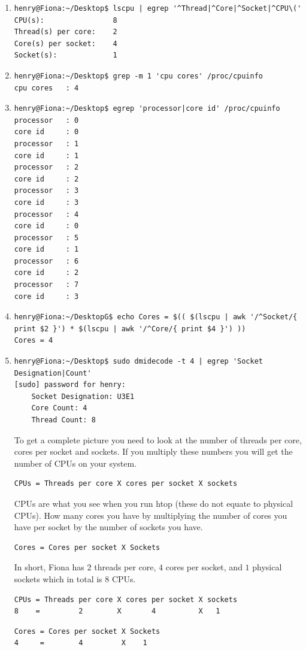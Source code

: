 \documentclass{article}
\begin{document}
\begin{enumerate}
\begin{verbatim}
\end{verbatim}
\normalsize
\item 
\tiny
\begin{verbatim}
henry@Fiona:~/Desktop$ lscpu | egrep '^Thread|^Core|^Socket|^CPU\('
CPU(s):                8
Thread(s) per core:    2
Core(s) per socket:    4
Socket(s):             1
\end{verbatim}
\normalsize
\item 
\tiny
\begin{verbatim}
henry@Fiona:~/Desktop$ grep -m 1 'cpu cores' /proc/cpuinfo
cpu cores	: 4
\end{verbatim}
\normalsize
\item 
\tiny
\begin{verbatim}
henry@Fiona:~/Desktop$ egrep 'processor|core id' /proc/cpuinfo
processor	: 0
core id		: 0
processor	: 1
core id		: 1
processor	: 2
core id		: 2
processor	: 3
core id		: 3
processor	: 4
core id		: 0
processor	: 5
core id		: 1
processor	: 6
core id		: 2
processor	: 7
core id		: 3
\end{verbatim}
\normalsize
\item 
\tiny
\begin{verbatim}
henry@Fiona:~/DesktopG$ echo Cores = $(( $(lscpu | awk '/^Socket/{ print $2 }') * $(lscpu | awk '/^Core/{ print $4 }') ))
Cores = 4
\end{verbatim}
\normalsize
\item 
\tiny
\begin{verbatim}
henry@Fiona:~/Desktop$ sudo dmidecode -t 4 | egrep 'Socket Designation|Count'
[sudo] password for henry: 
	Socket Designation: U3E1
	Core Count: 4
	Thread Count: 8
\end{verbatim}
\normalsize
To get a complete picture you need to look at the number of threads per core, cores per socket and sockets. If you multiply these numbers you will get the number of CPUs on your system.
\begin{verbatim}
CPUs = Threads per core X cores per socket X sockets 
\end{verbatim}
CPUs are what you see when you run htop (these do not equate to physical CPUs). How many cores you have by multiplying the number of cores you have per socket by the number of sockets you have.
\begin{verbatim}
Cores = Cores per socket X Sockets
\end{verbatim}
In short, Fiona has $2$ threads per core, $4$ cores per socket, and $1$ physical sockets which in total is $8$ CPUs.
\begin{verbatim}
CPUs = Threads per core X cores per socket X sockets 
8    =         2        X       4          X   1
\end{verbatim}
\begin{verbatim}
Cores = Cores per socket X Sockets
4     =        4         X    1
\end{verbatim}


\end{enumerate}
\end{document}
